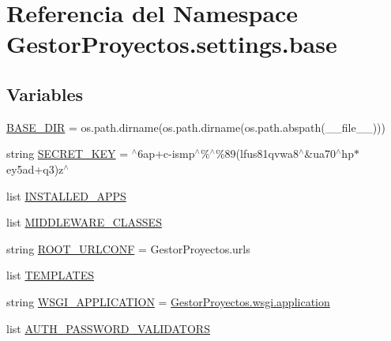 \hypertarget{namespace_gestor_proyectos_1_1settings_1_1base}{}\section{Referencia del Namespace Gestor\+Proyectos.\+settings.\+base}
\label{namespace_gestor_proyectos_1_1settings_1_1base}
\subsection*{Variables}
\begin{DoxyCompactItemize}
\item 
\hyperlink{namespace_gestor_proyectos_1_1settings_1_1base_a58a73f3168062df9c490527febb58c82}{B\+A\+S\+E\+\_\+\+D\+IR} = os.\+path.\+dirname(os.\+path.\+dirname(os.\+path.\+abspath(\+\_\+\+\_\+file\+\_\+\+\_\+)))
\item 
string \hyperlink{namespace_gestor_proyectos_1_1settings_1_1base_ae3de46aa4ae0ec054fb9ff844ff850f8}{S\+E\+C\+R\+E\+T\+\_\+\+K\+EY} = \textquotesingle{}$^\wedge$6ap+c-\/ismp$^\wedge$\%$^\wedge$\%89(lfus81qvwa8$^\wedge$\&ua70$^\wedge$hp$\ast$ey5ad+q3)z$^\wedge$\textquotesingle{}
\item 
list \hyperlink{namespace_gestor_proyectos_1_1settings_1_1base_aa6993132a93e138a35d70e714dc5d0e9}{I\+N\+S\+T\+A\+L\+L\+E\+D\+\_\+\+A\+P\+PS}
\item 
list \hyperlink{namespace_gestor_proyectos_1_1settings_1_1base_a155e70121919eb32247749de8d67a089}{M\+I\+D\+D\+L\+E\+W\+A\+R\+E\+\_\+\+C\+L\+A\+S\+S\+ES}
\item 
string \hyperlink{namespace_gestor_proyectos_1_1settings_1_1base_afd3707294f0dea9b45537fdbead3bb68}{R\+O\+O\+T\+\_\+\+U\+R\+L\+C\+O\+NF} = \textquotesingle{}Gestor\+Proyectos.\+urls\textquotesingle{}
\item 
list \hyperlink{namespace_gestor_proyectos_1_1settings_1_1base_a07d8c3b5090da69059a7167c68117e81}{T\+E\+M\+P\+L\+A\+T\+ES}
\item 
string \hyperlink{namespace_gestor_proyectos_1_1settings_1_1base_a11cf6c181d205a12f0e1300a4542e586}{W\+S\+G\+I\+\_\+\+A\+P\+P\+L\+I\+C\+A\+T\+I\+ON} = \textquotesingle{}\hyperlink{namespace_gestor_proyectos_1_1wsgi_a9a544331cc4b6400f6aa50e07498a523}{Gestor\+Proyectos.\+wsgi.\+application}\textquotesingle{}
\item 
list \hyperlink{namespace_gestor_proyectos_1_1settings_1_1base_a0e880b92b71be5123ac92abc6a87b2a0}{A\+U\+T\+H\+\_\+\+P\+A\+S\+S\+W\+O\+R\+D\+\_\+\+V\+A\+L\+I\+D\+A\+T\+O\+RS}

\end{DoxyCompactItemize}

